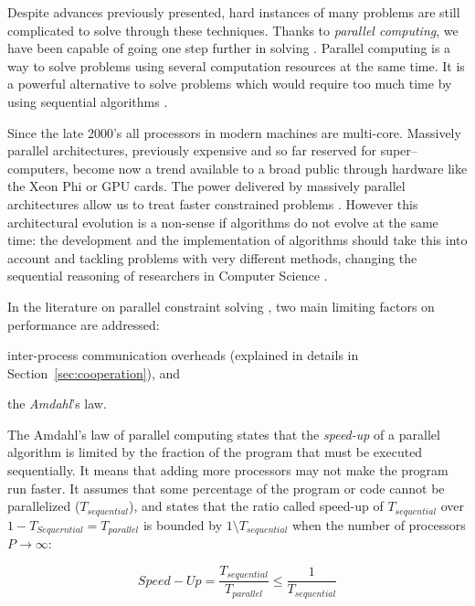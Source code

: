Despite advances previously presented, hard instances of many problems are still complicated to solve through these techniques. Thanks to \textit{parallel computing}, we have been capable of going one step further in solving \csps. Parallel computing is a way to solve problems using several computation resources at the same time. It is a powerful alternative to solve problems which would require too much time by using sequential algorithms \cite{Grama2003}. %

Since the late 2000's all processors in modern machines are multi-core. Massively parallel architectures, previously expensive and so far reserved for super--computers, become now a trend available to a broad public through hardware like the Xeon Phi or GPU cards. The power delivered by massively parallel architectures allow us to treat faster constrained problems \cite{Borkar2007}. However this architectural evolution is a non-sense if algorithms do not evolve at the same time: the development and the implementation of algorithms should take this into account and tackling problems with very different methods, changing the sequential reasoning of researchers in Computer Science \cite{Hill2008, Sanders2014}. 

In the literature on parallel constraint solving \cite{Gent}, two main limiting factors on performance are addressed: \begin{inparaenum}[1-] \item inter-process communication overheads (explained in details in Section~\ref{sec:cooperation}), and \item the \textit{Amdahl}'s law. \end{inparaenum} The Amdahl's law of parallel computing states that the \textit{speed-up} of a parallel algorithm is limited by the fraction of the program that must be executed sequentially. It means that adding more processors may not make the program run faster. It assumes that some percentage of the program or code cannot be parallelized ($T_{sequential}$), and states that the ratio called speed-up of $T_{sequential}$ over $1 - T_{Sequerntial} = T_{parallel}$ is bounded by $1\setminus T_{sequential}$ when the number of processors $P \rightarrow \infty$:

\begin{equation}\label{amdahl}
Speed-Up = \frac{T_{sequential}}{T_{parallel}} \leq \frac{1}{T_{sequential}}
\end{equation}

